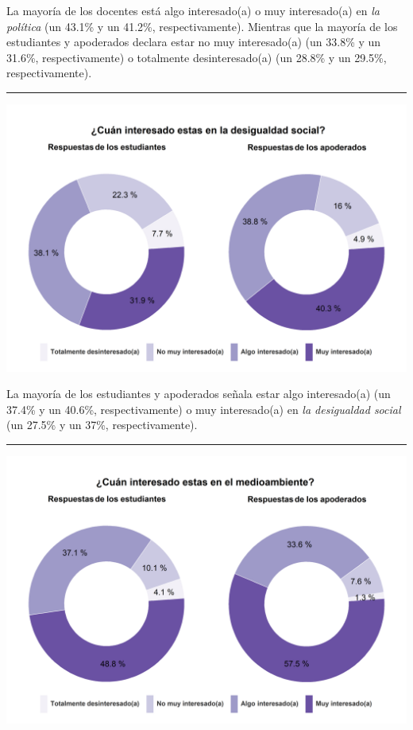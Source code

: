 \documentclass[
  14pt,
]{book}
\let\origfigure\figure
\let\endorigfigure\endfigure
\renewenvironment{figure}[1][2] {
  \expandafter\origfigure\expandafter[H]
} {
  \endorigfigure
}
\begin{document}
La mayoría de los docentes está algo interesado(a) o muy interesado(a) en \emph{la política} (un 43.1\% y un 41.2\%, respectivamente). Mientras que la mayoría de los estudiantes y apoderados declara estar no muy interesado(a) (un 33.8\% y un 31.6\%, respectivamente) o totalmente desinteresado(a) (un 28.8\% y un 29.5\%, respectivamente).

\begin{center}\rule{0.5\linewidth}{0.5pt}\end{center}

\begin{figure}[!ht]

{\centering \includegraphics[width=0.8\linewidth,]{images/graph_intdes} 

}

\caption{Interés en la desigualdad social}\label{fig:unnamed-chunk-38}
\end{figure}

La mayoría de los estudiantes y apoderados señala estar algo interesado(a) (un 37.4\% y un 40.6\%, respectivamente) o muy interesado(a) en \emph{la desigualdad social} (un 27.5\% y un 37\%, respectivamente).

\begin{center}\rule{0.5\linewidth}{0.5pt}\end{center}

\begin{figure}[!ht]

{\centering \includegraphics[width=0.8\linewidth,]{images/graph_intmed} 

}

\caption{Interés en el medioambiente}\label{fig:unnamed-chunk-39}
\end{figure}
\end{document}
